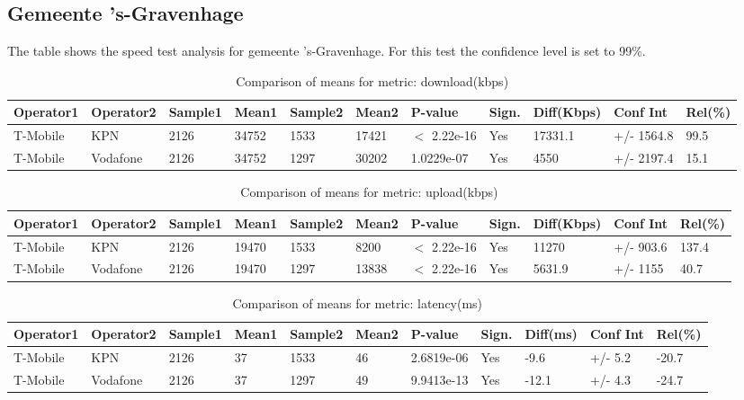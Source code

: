 \documentclass[]{article}
\begin{document}
\normalsize

\newpage

\subsection{Gemeente 's-Gravenhage}\label{gemeente-s-gravenhage}

The table shows the speed test analysis for gemeente 's-Gravenhage. For
this test the confidence level is set to 99\%.

\begin{table}[ht]
\centering
{\footnotesize
\begin{tabular}{lllllllllll}
  \hline
Operator1 & Operator2 & Sample1 & Mean1 & Sample2 & Mean2 & P-value & Sign. & Diff(Kbps) & Conf Int & Rel(\%) \\ 
  \hline
T-Mobile & KPN & 2126 & 34752 & 1533 & 17421 & $<$ 2.22e-16 & Yes & 17331.1 & +/- 1564.8 & 99.5 \\ 
  T-Mobile & Vodafone & 2126 & 34752 & 1297 & 30202 & 1.0229e-07 & Yes & 4550 & +/- 2197.4 & 15.1 \\ 
   \hline
\end{tabular}
}
\caption{Comparison of means for metric: download(kbps)} 
\end{table}

\begin{table}[ht]
\centering
{\footnotesize
\begin{tabular}{lllllllllll}
  \hline
Operator1 & Operator2 & Sample1 & Mean1 & Sample2 & Mean2 & P-value & Sign. & Diff(Kbps) & Conf Int & Rel(\%) \\ 
  \hline
T-Mobile & KPN & 2126 & 19470 & 1533 & 8200 & $<$ 2.22e-16 & Yes & 11270 & +/- 903.6 & 137.4 \\ 
  T-Mobile & Vodafone & 2126 & 19470 & 1297 & 13838 & $<$ 2.22e-16 & Yes & 5631.9 & +/- 1155 & 40.7 \\ 
   \hline
\end{tabular}
}
\caption{Comparison of means for metric: upload(kbps)} 
\end{table}

\begin{table}[ht]
\centering
{\footnotesize
\begin{tabular}{lllllllllll}
  \hline
Operator1 & Operator2 & Sample1 & Mean1 & Sample2 & Mean2 & P-value & Sign. & Diff(ms) & Conf Int & Rel(\%) \\ 
  \hline
T-Mobile & KPN & 2126 & 37 & 1533 & 46 & 2.6819e-06 & Yes & -9.6 & +/- 5.2 & -20.7 \\ 
  T-Mobile & Vodafone & 2126 & 37 & 1297 & 49 & 9.9413e-13 & Yes & -12.1 & +/- 4.3 & -24.7 \\ 
   \hline
\end{tabular}
}
\caption{Comparison of means for metric: latency(ms)} 
\end{table}
\end{document}
